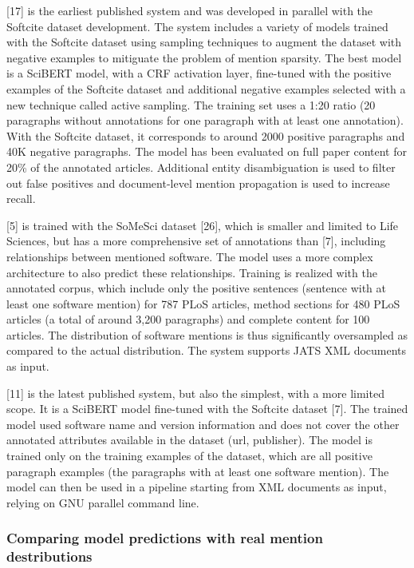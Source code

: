 \documentclass[
]{article}
\begin{document}
{[}17{]} is the earliest published system and was developed in parallel
with the Softcite dataset development. The system includes a variety of
models trained with the Softcite dataset using sampling techniques to
augment the dataset with negative examples to mitiguate the problem of
mention sparsity. The best model is a SciBERT model, with a CRF
activation layer, fine-tuned with the positive examples of the Softcite
dataset and additional negative examples selected with a new technique
called active sampling. The training set uses a 1:20 ratio (20
paragraphs without annotations for one paragraph with at least one
annotation). With the Softcite dataset, it corresponds to around 2000
positive paragraphs and 40K negative paragraphs. The model has been
evaluated on full paper content for 20\% of the annotated articles.
Additional entity disambiguation is used to filter out false positives
and document-level mention propagation is used to increase recall.

{[}5{]} is trained with the SoMeSci dataset {[}26{]}, which is smaller
and limited to Life Sciences, but has a more comprehensive set of
annotations than {[}7{]}, including relationships between mentioned
software. The model uses a more complex architecture to also predict
these relationships. Training is realized with the annotated corpus,
which include only the positive sentences (sentence with at least one
software mention) for 787 PLoS articles, method sections for 480 PLoS
articles (a total of around 3,200 paragraphs) and complete content for
100 articles. The distribution of software mentions is thus
significantly oversampled as compared to the actual distribution. The
system supports JATS XML documents as input.

{[}11{]} is the latest published system, but also the simplest, with a
more limited scope. It is a SciBERT model fine-tuned with the Softcite
dataset {[}7{]}. The trained model used software name and version
information and does not cover the other annotated attributes available
in the dataset (url, publisher). The model is trained only on the
training examples of the dataset, which are all positive paragraph
examples (the paragraphs with at least one software mention). The model
can then be used in a pipeline starting from XML documents as input,
relying on GNU parallel command line.

\hypertarget{comparing-model-predictions-with-real-mention-destributions}{%
\subsubsection{Comparing model predictions with real mention
destributions}\label{comparing-model-predictions-with-real-mention-destributions}}
\end{document}
